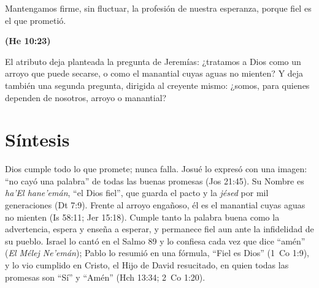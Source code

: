 \documentclass[11pt,letterpaper]{article}
\newcommand{\fuente}[1]{\par\hfill{\upshape\bfseries\small\textcolor{azul}{#1}}}
\begin{document}
\begin{cita}Mantengamos firme, sin fluctuar, la profesión de nuestra esperanza, porque fiel es el que prometió.\fuente{(He 10:23)}\end{cita}

El atributo deja planteada la pregunta de Jeremías: ¿tratamos a Dios como un arroyo que puede secarse, o como el manantial cuyas aguas no mienten? Y deja también una segunda pregunta, dirigida al creyente mismo: ¿somos, para quienes dependen de nosotros, arroyo o manantial?

\section{Síntesis}

\begin{tcolorbox}[colback=papiro,colframe=azul,boxrule=1pt,arc=3pt]
Dios cumple todo lo que promete; nunca falla. Josué lo expresó con una imagen: ``no cayó una palabra'' de todas las buenas promesas (Jos 21:45). Su Nombre es \emph{ha'El hane'emán}, ``el Dios fiel'', que guarda el pacto y la \emph{jésed} por mil generaciones (Dt 7:9). Frente al arroyo engañoso, él es el manantial cuyas aguas no mienten (Is 58:11; Jer 15:18). Cumple tanto la palabra buena como la advertencia, espera y enseña a esperar, y permanece fiel aun ante la infidelidad de su pueblo. Israel lo cantó en el Salmo 89 y lo confiesa cada vez que dice ``amén'' (\emph{El Mélej Ne'emán}); Pablo lo resumió en una fórmula, ``Fiel es Dios'' (1~Co 1:9), y lo vio cumplido en Cristo, el Hijo de David resucitado, en quien todas las promesas son ``Sí'' y ``Amén'' (Hch 13:34; 2~Co 1:20).
\end{tcolorbox}
\end{document}
